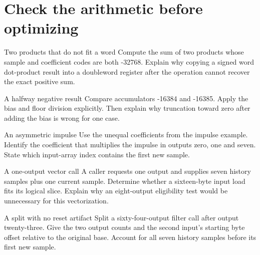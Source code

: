 \section{Check the arithmetic before optimizing}
\begin{MARSExercise}{Two products that do not fit a word}
  Compute the sum of two products whose sample and coefficient codes are both -32768.
  Explain why copying a signed word dot-product result into a doubleword register after
  the operation cannot recover the exact positive sum.
\end{MARSExercise}

\begin{MARSExercise}{A halfway negative result}
  Compare accumulators -16384 and -16385. Apply the bias and floor division explicitly.
  Then explain why truncation toward zero after adding the bias is wrong for one case.
\end{MARSExercise}

\begin{MARSExercise}{An asymmetric impulse}
  Use the unequal coefficients from the impulse example. Identify the coefficient that
  multiplies the impulse in outputs zero, one and seven. State which input-array index
  contains the first new sample.
\end{MARSExercise}

\begin{MARSExercise}{A one-output vector call}
  A caller requests one output and supplies seven history samples plus one current
  sample. Determine whether a sixteen-byte input load fits its logical slice. Explain
  why an eight-output eligibility test would be unnecessary for this vectorization.
\end{MARSExercise}

\begin{MARSExercise}{A split with no reset artifact}
  Split a sixty-four-output filter call after output twenty-three. Give the two output
  counts and the second input's starting byte offset relative to the original base.
  Account for all seven history samples before its first new sample.
\end{MARSExercise}
